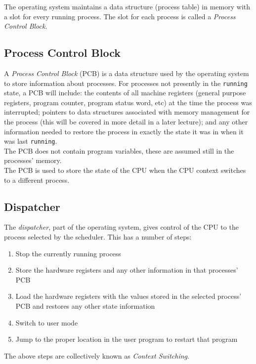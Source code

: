 The operating system maintains a data structure (process table) in memory with a slot for every running process. The slot for each process is called a \textit{Process Control Block}.

\subsection{Process Control Block}
A \textit{Process Control Block} (PCB) is a data structure used by the operating system to store information about processes. For processes not presently in the \verb|running| state, a PCB will include: the contents of all machine registers (general purpose registers, program counter, program status word, etc) at the time the process was interrupted; pointers to data structures associated with memory management for the process (this will be covered in more detail in a later lecture); and any other information needed to restore the process in exactly the state it was in when it was last \verb|running|.\\

The PCB does not contain program variables, these are assumed still in the processes' memory.\\

The PCB is used to store the state of the CPU when the CPU context switches to a different process. 

\subsection{Dispatcher}
The \textit{dispatcher}, part of the operating system, gives control of the CPU to the process selected by the scheduler. This has a number of steps:

\begin{enumerate}
    \item Stop the currently running process
    \item Store the hardware registers and any other information in that processes' PCB
    \item Load the hardware registers with the values stored in the selected process' PCB and restores any other state information
    \item Switch to user mode
    \item Jump to the proper location in the user program to restart that program
\end{enumerate}

The above steps are collectively known as \textit{Context Switching}.

